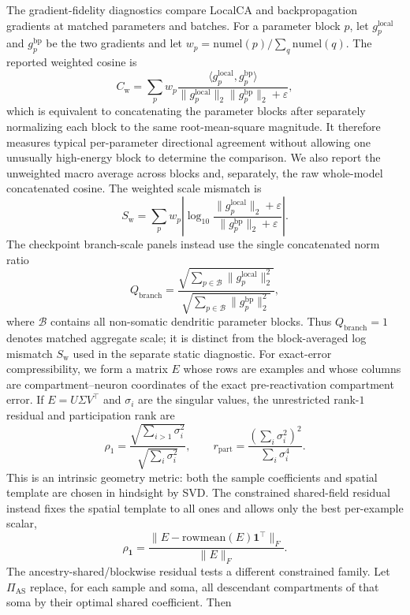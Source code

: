     The gradient-fidelity diagnostics compare LocalCA and backpropagation gradients at matched parameters and batches. For a parameter block $p$, let $g_p^{\mathrm{local}}$ and $g_p^{\mathrm{bp}}$ be the two gradients and let $w_p=\mathrm{numel}(p)/\sum_q\mathrm{numel}(q)$. The reported weighted cosine is
    \[
    C_{\mathrm{w}}=\sum_p w_p
    \frac{\langle g_p^{\mathrm{local}},g_p^{\mathrm{bp}}\rangle}
    {\|g_p^{\mathrm{local}}\|_2\|g_p^{\mathrm{bp}}\|_2+\varepsilon},
    \]
    which is equivalent to concatenating the parameter blocks after separately normalizing each block to the same root-mean-square magnitude. It therefore measures typical per-parameter directional agreement without allowing one unusually high-energy block to determine the comparison. We also report the unweighted macro average across blocks and, separately, the raw whole-model concatenated cosine. The weighted scale mismatch is
    \[
    S_{\mathrm{w}}=\sum_p w_p
    \left|\log_{10}\frac{\|g_p^{\mathrm{local}}\|_2+\varepsilon}
    {\|g_p^{\mathrm{bp}}\|_2+\varepsilon}\right|.
    \]
    The checkpoint branch-scale panels instead use the single concatenated norm ratio
    \[
    Q_{\mathrm{branch}}=
    \frac{\sqrt{\sum_{p\in\mathcal{B}}\|g_p^{\mathrm{local}}\|_2^2}}
    {\sqrt{\sum_{p\in\mathcal{B}}\|g_p^{\mathrm{bp}}\|_2^2}},
    \]
    where $\mathcal{B}$ contains all non-somatic dendritic parameter blocks. Thus $Q_{\mathrm{branch}}=1$ denotes matched aggregate scale; it is distinct from the block-averaged log mismatch $S_{\mathrm{w}}$ used in the separate static diagnostic.
    For exact-error compressibility, we form a matrix $E$ whose rows are examples and whose columns are compartment--neuron coordinates of the exact pre-reactivation compartment error. If $E=U\Sigma V^\top$ and $\sigma_i$ are the singular values, the unrestricted rank-$1$ residual and participation rank are
    \[
    \rho_1=\frac{\sqrt{\sum_{i>1}\sigma_i^2}}{\sqrt{\sum_i\sigma_i^2}},
    \qquad
    r_{\mathrm{part}}=\frac{(\sum_i\sigma_i^2)^2}{\sum_i\sigma_i^4}.
    \]
    This is an intrinsic geometry metric: both the sample coefficients and spatial template are chosen in hindsight by SVD. The constrained shared-field residual instead fixes the spatial template to all ones and allows only the best per-example scalar,
    \[
    \rho_{\mathbf{1}}=
    \frac{\|E-\mathrm{rowmean}(E)\mathbf{1}^{\top}\|_F}{\|E\|_F}.
    \]
    The ancestry-shared/blockwise residual tests a different constrained family. Let $\Pi_{\mathrm{AS}}$ replace, for each sample and soma, all descendant compartments of that soma by their optimal shared coefficient. Then
